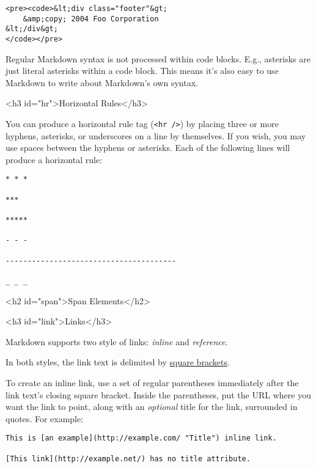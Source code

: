 \begin{lstlisting}
<pre><code>&lt;div class="footer"&gt;
    &amp;copy; 2004 Foo Corporation
&lt;/div&gt;
</code></pre>
\end{lstlisting}




Regular Markdown syntax is not processed within code blocks. E.g.,
asterisks are just literal asterisks within a code block. This means
it's also easy to use Markdown to write about Markdown's own syntax.

<h3 id="hr">Horizontal Rules</h3>



You can produce a horizontal rule tag (\texttt{<hr />}) by placing three or
more hyphens, asterisks, or underscores on a line by themselves. If you
wish, you may use spaces between the hyphens or asterisks. Each of the
following lines will produce a horizontal rule:

\begin{lstlisting}
* * *

***

*****

- - -

---------------------------------------

_ _ _
\end{lstlisting}


\noindent\makebox[\linewidth]{\rule{\linewidth}{0.4pt}}\medskip


<h2 id="span">Span Elements</h2>

<h3 id="link">Links</h3>



Markdown supports two style of links: \emph{inline} and \emph{reference}.



In both styles, the link text is delimited by \href{}{square brackets}.



To create an inline link, use a set of regular parentheses immediately
after the link text's closing square bracket. Inside the parentheses,
put the URL where you want the link to point, along with an \emph{optional}
title for the link, surrounded in quotes. For example:

\begin{lstlisting}
This is [an example](http://example.com/ "Title") inline link.

[This link](http://example.net/) has no title attribute.
\end{lstlisting}




